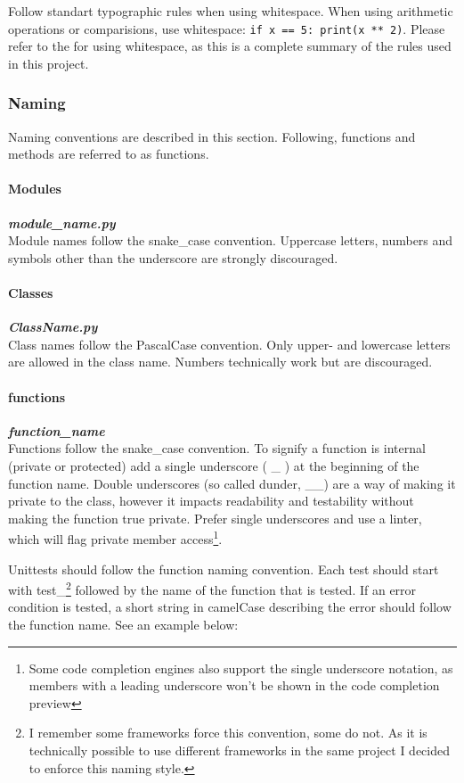 Follow standart typographic rules when using whitespace. When using arithmetic
operations or comparisions, use whitespace: \verb|if x == 5: print(x ** 2)|. 
Please refer to the \RefGoogleStyle{} for using whitespace, as this
is a complete summary of the rules used in this project.


\subsubsection{Naming}
Naming conventions are described in this section. Following, functions and
methods are referred to as functions. 

\newpage

\paragraph{Modules} \textbf{\textit{module\_name.py}} \\
Module names follow the snake\_case convention. Uppercase letters, numbers and
symbols other than the underscore are strongly discouraged.

\paragraph{Classes} \textbf{\textit{ClassName.py}}  \\
Class names follow the PascalCase convention. Only upper- and lowercase letters
are allowed in the class name. Numbers technically work but are discouraged.

\paragraph{functions} \textbf{\textit{function\_name}} \\
Functions follow the snake\_case convention. To signify a function is internal
(private or protected) add a single underscore ( \_ ) at the beginning of the
function name. Double underscores (so called {\glqq dunder\grqq}, \_\_) are a
way of making it private to the class, however it impacts readability and
testability without making the function {\glqq true private\grqq}. Prefer
single underscores and use a linter, which will flag private member
access\footnote{Some code completion engines also support the single underscore
notation, as members with a leading underscore won't be shown in the code
completion preview}.

Unittests should follow the function naming convention. Each test should start
with {\glqq test\_\grqq}\footnote{I remember some frameworks force this
convention, some do not. As it is technically possible to use different
frameworks in the same project I decided to enforce this naming style.}
followed by the name of the function that is tested. If an error condition is
tested, a short string in camelCase describing the error should follow the
function name. See an example below:

